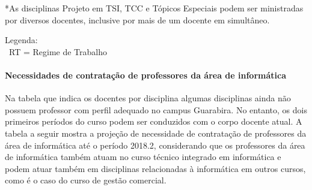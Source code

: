\newpage
*As disciplinas Projeto em TSI, TCC e T\'opicos Especiais podem ser ministradas por diversos docentes, inclusive por mais de um docente em simult\^aneo.

Legenda:
\\~RT = Regime de Trabalho

\paragraph{Necessidades de contrata\c{c}\~ao de professores da \'area de inform\'atica}

Na tabela que indica os docentes por disciplina algumas disciplinas ainda n\~ao possuem professor com perfil adequado no campus Guarabira. No entanto, os dois primeiros per\'iodos do curso podem ser conduzidos com o corpo docente atual. A tabela a seguir mostra a proje\c{c}\~ao de necessidade de contrata\c{c}\~ao de professores da \'area de inform\'atica at\'e o per\'iodo 2018.2, considerando que os professores da \'area de inform\'atica tamb\'em atuam no curso t\'ecnico integrado em inform\'atica e podem atuar tamb\'em em disciplinas relacionadas \`a inform\'atica em outros cursos, como \'e o caso do curso de gest\~ao comercial.

